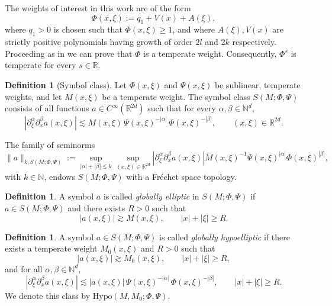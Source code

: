 \documentclass[12pt,reqno,a4paper]{amsart}
\numberwithin{equation}{section}
\theoremstyle{plain}
\theoremstyle{definition}
\newtheorem{definition}[theorem]{Definition}
\theoremstyle{remark}
\begin{document}
The weights of interest in this work are of the form
\[
\Phi(x,\xi)
:= q_{1} + V(x) + A(\xi),
\]
where $q_{1}>0$ is chosen such that $\Phi(x,\xi)\ge 1$, and where $A(\xi), V(x)$ are  strictly positive  polynomials having growth of order $2l$ and $2k$ respectively. Proceeding as in \cite{dasgupta2026phase} we can prove that $\Phi$ is a temperate weight.
 Consequently, $\Phi^s$ is temperate for every $s\in\mathbb{R}$.

\begin{definition}[Symbol class]
\label{Symboldefinition}
Let $\Phi(x,\xi)$ and $\Psi(x,\xi)$ be sublinear, temperate weights, and let
$M(x,\xi)$ be a temperate weight. The symbol class $S(M;\Phi,\Psi)$ consists of
all functions $a\in C^\infty(\mathbb{R}^{2d})$ such that for every
$\alpha,\beta\in\mathbb{N}^d$,
\[
|\partial_\xi^\alpha \partial_x^\beta a(x,\xi)|
\lesssim
M(x,\xi)\,\Psi(x,\xi)^{-|\alpha|}\,\Phi(x,\xi)^{-|\beta|},
\qquad (x,\xi)\in\mathbb{R}^{2d}.
\]
\end{definition}

The family of seminorms
\[
\|a\|_{k,S(M;\Phi,\Psi)}
:=
\sup_{|\alpha|+|\beta|\le k}
\sup_{(x,\xi)\in\mathbb{R}^{2d}}
|\partial_\xi^\alpha \partial_x^\beta a(x,\xi)|
M(x,\xi)^{-1}\Psi(x,\xi)^{|\alpha|}\Phi(x,\xi)^{|\beta|},
\]
with $k\in\mathbb{N}$, endows $S(M;\Phi,\Psi)$ with a Fr\'echet space topology.

\begin{definition}
A symbol $a$ is called \emph{globally elliptic} in $S(M;\Phi,\Psi)$ if
$a\in S(M;\Phi,\Psi)$ and there exists $R>0$ such that
\begin{equation}\label{eqn1}
|a(x,\xi)| \gtrsim M(x,\xi),
\qquad |x|+|\xi|\ge R.
\end{equation}
\end{definition}

\begin{definition}
A symbol $a\in S(M;\Phi,\Psi)$ is called \emph{globally hypoelliptic} if there exists
a temperate weight $M_0(x,\xi)$ and $R>0$ such that
\begin{equation}\label{eqn2}
|a(x,\xi)| \gtrsim M_0(x,\xi),
\qquad |x|+|\xi|\ge R,
\end{equation}
and for all $\alpha,\beta\in\mathbb{N}^d$,
\begin{equation}\label{eqn3}
|\partial_\xi^\alpha \partial_x^\beta a(x,\xi)|
\lesssim
|a(x,\xi)|\,\Psi(x,\xi)^{-|\alpha|}\,\Phi(x,\xi)^{-|\beta|},
\qquad |x|+|\xi|\ge R.
\end{equation}
We denote this class by $\mathrm{Hypo}(M,M_0;\Phi,\Psi)$.
\end{definition}
\end{document}
